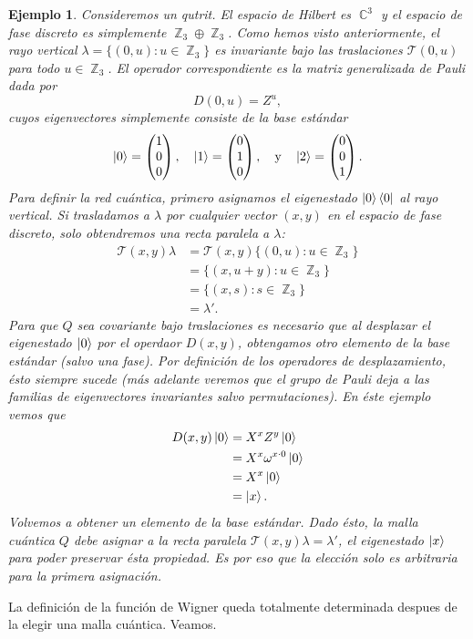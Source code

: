 \documentclass[a4paper]{report}
\DeclareMathOperator{\C}{\mathbb{C}}
\DeclareMathOperator{\Z}{\mathbb{Z}}
\newtheorem{example}{Ejemplo}
\begin{document}
  \begin{example}
    Consideremos un qutrit. El espacio de Hilbert es
    $\C^{3}$ y el espacio de fase discreto es simplemente
    $\Z_3 \oplus \Z_3$. Como hemos visto anteriormente, el
    rayo vertical $\lambda = \{(0,u) : u \in \Z_3\}$ es
    invariante bajo las traslaciones $\mathcal T(0,u)$ para
    todo $u \in \Z_3$. El operador correspondiente es la
    matriz generalizada de Pauli dada por
    \[
      D(0,u) = Z^{u},
    \] 
    cuyos eigenvectores simplemente consiste de la base
    estándar
    \[
      \ket 0 = \begin{pmatrix} 1\\0\\0 \end{pmatrix},
      \quad
      \ket 1 = \begin{pmatrix} 0\\1\\0 \end{pmatrix},
      \quad \text{y} \quad
      \ket 2 = \begin{pmatrix} 0\\0\\1 \end{pmatrix}.
    \] 
    Para definir la red cuántica, primero asignamos el
    eigenestado $\ket 0 \bra 0$ al rayo vertical. Si
    trasladamos a $\lambda$ por \textit{cualquier} vector
    $(x,y)$ en el espacio de fase discreto, solo obtendremos
    una recta paralela a $\lambda$:
    \begin{align}
      \mathcal T(x,y) \lambda
      &= \mathcal T(x,y) \{(0,u) : u \in \Z_3\} \\
      &= \{(x,u+y) : u \in \Z_3\} \\
      &= \{(x,s) : s \in \Z_3\} \\
      &= \lambda'.
    \end{align}
    Para que $Q$ sea covariante bajo traslaciones es
    necesario que al desplazar el eigenestado $\ket 0$ por
    el operdaor $D(x,y)$, obtengamos otro elemento de la
    base estándar (salvo una fase). Por definición de los
    operadores de desplazamiento, ésto siempre sucede (más
    adelante veremos que el grupo de Pauli deja a las
    familias de eigenvectores invariantes salvo
    permutaciones). En éste ejemplo vemos que
    \begin{align}
      D(x,y) \ket 0
      &= X^{x} Z^{y} \ket 0 \\
      &= X^{x} \omega^{x \cdot 0} \ket 0 \\
      &= X^{x} \ket 0 \\
      &= \ket x.
    \end{align}
    Volvemos a obtener un elemento de la base estándar. Dado
    ésto, la malla cuántica $Q$ debe asignar a la recta
    paralela $\mathcal T(x,y) \lambda = \lambda'$, el
    eigenestado $\ket x$ para poder preservar ésta
    propiedad. Es por eso que la elección solo es arbitraria
    para la primera asignación.
  \end{example}
  La definición de la función de Wigner queda totalmente
  determinada despues de la elegir una malla cuántica.
  Veamos.
\end{document}
